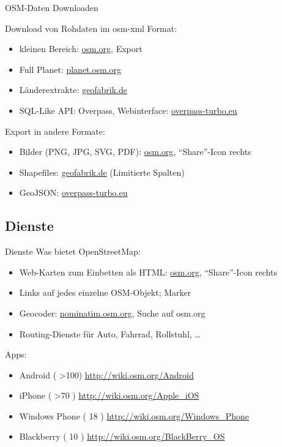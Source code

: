\documentclass{beamer}
\begin{document}
\begin{frame}{OSM-Daten Downloaden}

	Download von Rohdaten im osm-xml Format:
\begin{itemize}
	\item kleinen Bereich: \href{http://osm.org}{osm.org}, Export
	\item Full Planet: \href{http://planet.osm.org}{planet.osm.org}
	\item Länderextrakte: \href{http://download.geofabrik.de}{geofabrik.de}
	\item SQL-Like API: Overpass, Webinterface: \href{http://overpass-turbo.eu}{overpass-turbo.eu}
\end{itemize}
\pause
Export in andere Formate: 
\begin{itemize}
	\item Bilder (PNG, JPG, SVG, PDF): \href{http://osm.org}{osm.org}, "`Share"'-Icon rechts
	\item Shapefiles: \href{http://download.geofabrik.de}{geofabrik.de} (Limitierte Spalten)
	\item GeoJSON: \href{http://overpass-turbo.eu}{overpass-turbo.eu}
\end{itemize}

\end{frame}

\subsection{Dienste}

\begin{frame}{Dienste}
	Was bietet OpenStreetMap:
\begin{itemize}
	\item Web-Karten zum Einbetten als HTML: \href{http://osm.org}{osm.org}, "`Share"'-Icon rechts
		\pause
	\item Links auf jedes einzelne OSM-Objekt; Marker
		\pause
	\item Geocoder: \href{http://nominatim.osm.org}{nominatim.osm.org}, Suche auf osm.org
		\pause
	\item Routing-Dienste für Auto, Fahrrad, Rollstuhl, \dots
\end{itemize}

\pause
Apps:
\begin{itemize}
   \item  Android ( \textgreater 100) \url{http://wiki.osm.org/Android}
   \item  iPhone ( \textgreater 70 )  \url{http://wiki.osm.org/Apple\_iOS}
   \item  Windows Phone ( 18 ) \url{http://wiki.osm.org/Windows\_Phone}
   \item  Blackberry ( 10 ) \url{http://wiki.osm.org/BlackBerry\_OS}
 \end{itemize}

\end{frame}
\end{document}
